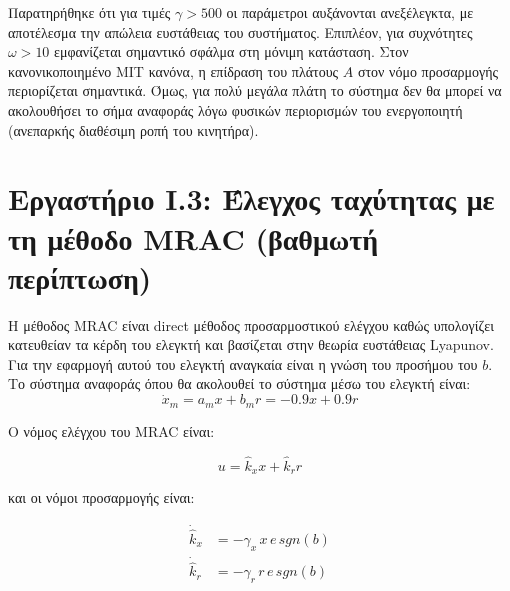 \documentclass{article}
\begin{document}
    \hfill\break
    Παρατηρήθηκε ότι για τιμές $\gamma > 500$ οι παράμετροι αυξάνονται ανεξέλεγκτα, με αποτέλεσμα την απώλεια ευστάθειας του συστήματος. Επιπλέον, για συχνότητες $\omega > 10$ εμφανίζεται σημαντικό σφάλμα στη μόνιμη κατάσταση. Στον κανονικοποιημένο MIT κανόνα, η επίδραση του πλάτους $A$ στον νόμο προσαρμογής περιορίζεται σημαντικά. Όμως, για πολύ μεγάλα πλάτη το σύστημα δεν θα μπορεί να ακολουθήσει το σήμα αναφοράς λόγω φυσικών περιορισμών του ενεργοποιητή (ανεπαρκής διαθέσιμη ροπή του κινητήρα).

    
    \section{Εργαστήριο I.3: Έλεγχος ταχύτητας με τη μέθοδο MRAC (βαθμωτή περίπτωση)}
    Η μέθοδος MRAC είναι direct μέθοδος προσαρμοστικού ελέγχου καθώς υπολογίζει κατευθείαν τα κέρδη του ελεγκτή και βασίζεται στην θεωρία ευστάθειας Lyapunov. Για την εφαρμογή αυτού του ελεγκτή αναγκαία είναι η γνώση του προσήμου του \(b\). Το σύστημα αναφοράς όπου θα ακολουθεί το σύστημα μέσω του ελεγκτή είναι:
    \begin{equation*}
        \dot{x}_m = a_mx + b_mr =-0.9x + 0.9r
    \end{equation*}

    \noindent
    Ο νόμος ελέγχου του MRAC είναι:
    
    \begin{equation*}
        u = \hat{k}_xx + \hat{k}_rr
    \end{equation*}
    
    \noindent
    και οι νόμοι προσαρμογής είναι:
    
    \begin{equation*}
        \begin{aligned}
            \dot{\hat{k}}_x &= -γ_x\,x\,e\,sgn(b) \\
            \dot{\hat{k}}_r &= -γ_r\,r\,e\,sgn(b)
        \end{aligned}
    \end{equation*}
    
\end{document}

